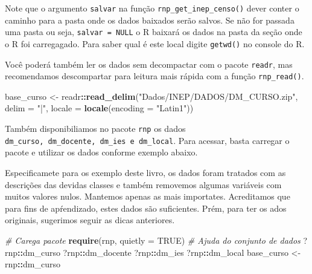 \documentclass[11pt,]{style/krantz}
\makeatletter
\newenvironment{Shaded}{\begin{snugshade}}{\end{snugshade}}
\newcommand{\CommentTok}[1]{\textcolor[rgb]{0.56,0.35,0.01}{\textit{#1}}}
\newcommand{\DataTypeTok}[1]{\textcolor[rgb]{0.13,0.29,0.53}{#1}}
\newcommand{\KeywordTok}[1]{\textcolor[rgb]{0.13,0.29,0.53}{\textbf{#1}}}
\newcommand{\NormalTok}[1]{#1}
\newcommand{\OperatorTok}[1]{\textcolor[rgb]{0.81,0.36,0.00}{\textbf{#1}}}
\newcommand{\OtherTok}[1]{\textcolor[rgb]{0.56,0.35,0.01}{#1}}
\newcommand{\StringTok}[1]{\textcolor[rgb]{0.31,0.60,0.02}{#1}}
\renewenvironment{quote}{\begin{VF}}{\end{VF}}
\newenvironment{kframe}{%
\medskip{}
\setlength{\fboxsep}{.8em}
 \def\at@end@of@kframe{}%
 \ifinner\ifhmode%
  \def\at@end@of@kframe{\end{minipage}}%
  \begin{minipage}{\columnwidth}%
 \fi\fi%
 \def\FrameCommand##1{\hskip\@totalleftmargin \hskip-\fboxsep
 \colorbox{shadecolor}{##1}\hskip-\fboxsep
     \hskip-\linewidth \hskip-\@totalleftmargin \hskip\columnwidth}%
 \MakeFramed {\advance\hsize-\width
   \@totalleftmargin\z@ \linewidth\hsize
   \@setminipage}}%
 {\par\unskip\endMakeFramed%
 \at@end@of@kframe}
\renewenvironment{Shaded}{\begin{kframe}}{\end{kframe}}
\theoremstyle{definition}
\theoremstyle{definition}
\theoremstyle{definition}
\theoremstyle{remark}
\makeatother
\begin{document}
\begin{quote}
Note que o argumento \texttt{salvar} na função \texttt{rnp\_get\_inep\_censo()} dever conter o caminho para a pasta onde os dados baixados serão salvos.
Se não for passada uma pasta ou seja, \texttt{salvar\ =\ NULL} o R baixará os dados na pasta da seção onde o R foi carregagado. Para saber qual é este local digite \texttt{getwd()} no console do R.
\end{quote}

Você poderá também ler os dados sem decompactar com o pacote \texttt{readr}, mas recomendamos descompartar para leitura mais rápida com a função \texttt{rnp\_read()}.

\begin{Shaded}
\begin{Highlighting}[]
\NormalTok{base_curso <-}\StringTok{ }\NormalTok{readr}\OperatorTok{::}\KeywordTok{read_delim}\NormalTok{(}\StringTok{"Dados/INEP/DADOS/DM_CURSO.zip"}\NormalTok{, }
                        \DataTypeTok{delim =} \StringTok{"|"}\NormalTok{, }\DataTypeTok{locale =} \KeywordTok{locale}\NormalTok{(}\DataTypeTok{encoding =} \StringTok{"Latin1"}\NormalTok{))}
\end{Highlighting}
\end{Shaded}

Também disponibiliamos no pacote \texttt{rnp} os dados \texttt{dm\_curso,\ dm\_docente,\ dm\_ies\ e\ dm\_local}. Para acessar, basta carregar o pacote e utilizar os dados conforme exemplo abaixo.

\begin{quote}
Especificamete para os exemplo deste livro, os dados foram tratados com as descrições das devidas classes e também removemos algumas variáveis com muitos valores nulos. Mantemos apenas as mais importates. Acreditamos que para fins de apŕendizado, estes dados são suficientes. Prém, para ter os ados originais, sugerimos seguir as dicas anteriores.
\end{quote}

\begin{Shaded}
\begin{Highlighting}[]
\CommentTok{# Carega pacote}
\KeywordTok{require}\NormalTok{(rnp, }\DataTypeTok{quietly =} \OtherTok{TRUE}\NormalTok{)}
\CommentTok{# Ajuda do conjunto de dados}
\NormalTok{?rnp}\OperatorTok{::}\NormalTok{dm_curso}
\NormalTok{?rnp}\OperatorTok{::}\NormalTok{dm_docente}
\NormalTok{?rnp}\OperatorTok{::}\NormalTok{dm_ies}
\NormalTok{?rnp}\OperatorTok{::}\NormalTok{dm_local}
\NormalTok{base_curso <-}\StringTok{ }\NormalTok{rnp}\OperatorTok{::}\NormalTok{dm_curso}
\end{Highlighting}
\end{Shaded}
\end{document}
